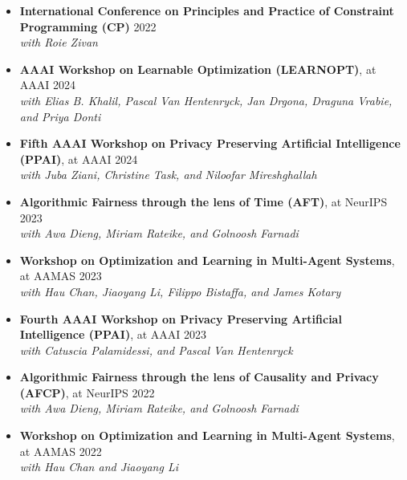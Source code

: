 
\begin{itemize}    
    \item {\bf International Conference on Principles and Practice of Constraint Programming (CP)}  \hfill{2022} \\
    {\em with Roie Zivan}
\end{itemize}

  \begin{itemize}
    \item 
    {\bf AAAI Workshop on Learnable Optimization (LEARNOPT)}, at AAAI   \hfill{2024}
    \\{\em with Elias B. Khalil, Pascal Van Hentenryck, Jan Drgona, Draguna Vrabie, and Priya Donti}

    \item 
    {\bf Fifth AAAI Workshop on Privacy Preserving Artificial Intelligence (PPAI)}, at AAAI   \hfill{2024}
    \\{\em with Juba Ziani, Christine Task, and Niloofar Mireshghallah}

    \item
    {\bf Algorithmic Fairness through the lens of Time (AFT)}, at NeurIPS \hfill {2023}
    \\{\em with Awa Dieng, Miriam Rateike, and Golnoosh Farnadi}

    \item 
    {\bf Workshop on Optimization and Learning in Multi-Agent Systems}, at AAMAS \hfill{2023}
    \\{\em with Hau Chan, Jiaoyang Li, Filippo Bistaffa, and James Kotary}

    \item 
    {\bf Fourth AAAI Workshop on Privacy Preserving Artificial Intelligence (PPAI)}, at AAAI   \hfill{2023}
    \\{\em with Catuscia Palamidessi, and Pascal Van Hentenryck}

    \item
    {\bf Algorithmic Fairness through the lens of Causality and Privacy (AFCP)}, at NeurIPS \hfill {2022}
    \\{\em with Awa Dieng, Miriam Rateike, and Golnoosh Farnadi}

    \item 
    {\bf Workshop on Optimization and Learning in Multi-Agent Systems}, at AAMAS \hfill{2022}
    \\{\em with Hau Chan and Jiaoyang Li}


\end{itemize}
